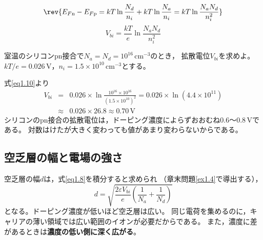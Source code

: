 \begin{equation*}
\rev{E_{F\mathrm{n}} - E_{F\mathrm{p}} = kT\ln\frac{N_d}{n_i} + kT\ln\frac{N_a}{n_i}
= kT\ln\frac{N_a N_d}{n_i^2}}
\end{equation*}
\begin{equation}
V_{bi} = \frac{kT}{e} \ln\frac{N_a N_d}{n_i^2}
\label{eq1.10}
\end{equation}

\begin{例題}[拡散電位]
\label{rei1.3}
室温のシリコンpn接合で$N_a = N_d = 10^{16}\,\mathrm{cm^{-3}}$のとき，
拡散電位$V_{bi}$を求めよ。
$kT/e = 0.026$\,V，$n_i = 1.5\times10^{10}\,\mathrm{cm^{-3}}$とする。
\begin{解答}
式\ref{eq1.10}より
\begin{eqnarray}
V_{bi} &=& 0.026 \times \ln\frac{10^{16}\times10^{16}}{(1.5\times10^{10})^2}
= 0.026 \times \ln(4.4\times10^{11}) \nonumber\\
&\approx& 0.026 \times 26.8 \approx 0.70\,\mathrm{V} \nonumber
\end{eqnarray}
シリコンのpn接合の拡散電位は，ドーピング濃度によらずおおむね0.6〜0.8\,Vである。
対数はけたが大きく変わっても値があまり変わらないからである。
\end{解答}
\end{例題}

\subsection{空乏層の幅と電場の強さ}

空乏層の幅$d$は，式\ref{eq1.8}を積分すると求められ
（章末問題\ref{ex1.4}で導出する），
\begin{equation}
d = \sqrt{\frac{2\varepsilon V_{bi}}{e}\left(\frac{1}{N_a}+\frac{1}{N_d}\right)}
\label{eq1.11}
\end{equation}
となる。ドーピング濃度が低いほど空乏層は広い。
同じ電荷を集めるのに，キャリアの薄い領域では広い範囲のイオンが必要だからである。
また，濃度に差があるときは\textbf{濃度の低い側に深く広がる}。

